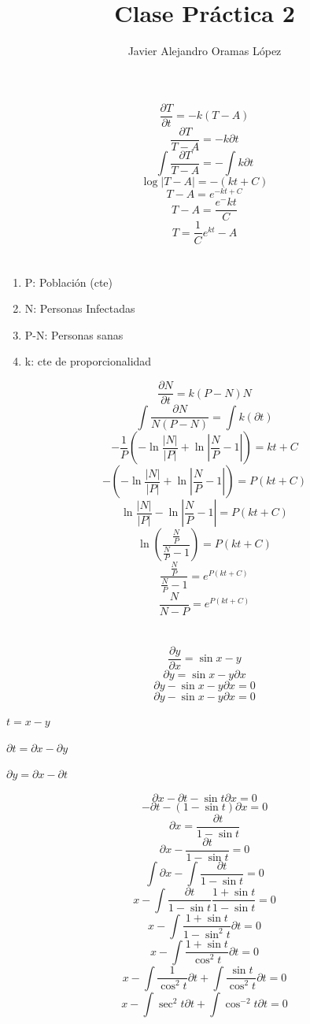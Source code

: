 \documentclass{article}
\title{Clase Práctica 2}
\author{Javier Alejandro Oramas López}
\date{}
\begin{document}
    \maketitle
    \section{}
    \[ \frac{\partial{T}}{\partial{t}} = -k(T-A) \]
    \[ \frac{\partial{T}}{T-A} = -k \partial{t} \]
    \[ \int \frac{\partial{T}}{T-A} = -\int k \partial{t} \]
    \[ \log{|T-A|} = -(kt+C) \]
    \[ T-A = e^{-kt+C} \]
    \[ T-A = \frac{e^-kt}{C} \]
    \[ T = \frac{1}{C}e^{kt} - A\]
    
\section{}
    \begin{enumerate}
        \item P: Población (cte)
        \item N: Personas Infectadas 
        \item P-N: Personas sanas
        \item k: cte de proporcionalidad
    \end{enumerate}

    \[ \frac{\partial{N}}{\partial{t}} = k(P-N)N \]
    \[ \int \frac{\partial{N}}{N(P-N)} = \int k(\partial{t}) \]
    \[ - \frac{1}{P} \left( - \ln{\frac{|N|}{|P|} + \ln{|\frac{N}{P} -1|}} \right) = kt +C\]
    \[ - \left( - \ln{\frac{|N|}{|P|} + \ln{|\frac{N}{P} -1|}} \right) = P(kt +C)\]
    \[ \ln{\frac{|N|}{|P|} - \ln{|\frac{N}{P} -1|}} = P(kt +C) \]
    \[ \ln(\frac{\frac{N}{P}}{\frac{N}{P} -1}) = P(kt +C)\]
    \[ \frac{\frac{N}{P}}{\frac{N}{P} -1} = e^{P(kt +C)}\]
    \[ \frac{N}{N-P} = e^{P(kt +C)}\]
    
\section{}

    \[ \frac{\partial{y}}{\partial{x}} = \sin{x-y} \]
    \[ \partial{y} = \sin{x-y}\partial{x} \]
    \[ \partial{y} - \sin{x-y}\partial{x} = 0\]
    \[ \partial{y} - \sin{x-y}\partial{x} = 0\]
    
    $t = x-y$

    $\partial{t} = \partial{x}-\partial{y}$

    $\partial{y} = \partial{x} - \partial{t}$

    \[ \partial{x} - \partial{t} - \sin{t}\partial{x} = 0\]
    \[  - \partial{t} - (1 - \sin{t})\partial{x} = 0\]
    \[  \partial{x} = \frac{\partial{t}}{1 - \sin{t}}\]
    \[  \partial{x} - \frac{\partial{t}}{1 - \sin{t}} = 0\]
    \[ \int \partial{x} - \int{\frac{\partial{t}}{1 - \sin{t}}} = 0 \]
    \[ x - \int{\frac{\partial{t}}{1 - \sin{t}}\frac{{1 + \sin{t}}}{1 - \sin{t}}} = 0 \]
    \[ x - \int{\frac{1 + \sin{t}}{1-\sin^{2}{t}}\partial{t}} = 0 \]
    \[ x - \int{\frac{1 + \sin{t}}{\cos^{2}{t}}\partial{t}} = 0 \]
    \[ x - \int{\frac{1}{\cos^{2}{t}}\partial{t}}+\int{\frac{\sin{t}}{\cos^{2}{t}}\partial{t}} = 0 \]
    \[ x - \int{\sec^{2}{t}\partial{t}}+\int{\cos^{-2}{t}\partial{t}} = 0 \]
\end{document}
